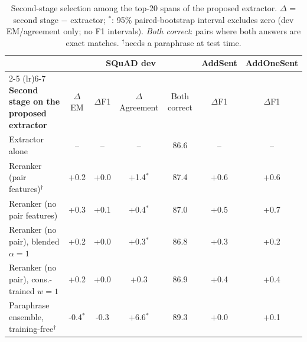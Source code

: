 \begin{table}[t]
\centering\small
\setlength{\tabcolsep}{5pt}
\begin{tabular}{lcccc@{\hspace{14pt}}cc}
\toprule
& \multicolumn{4}{c}{\textbf{SQuAD dev}} & \textbf{AddSent} & \textbf{AddOneSent} \\
\cmidrule(lr){2-5} \cmidrule(lr){6-7}
\textbf{Second stage on the proposed extractor} & $\Delta$EM & $\Delta$F1 & $\Delta$Agreement & Both correct & $\Delta$F1 & $\Delta$F1 \\
\midrule
Extractor alone & -- & -- & -- & 86.6 & -- & -- \\
Reranker (pair features)$^\dagger$ & +0.2 & +0.0 & +1.4$^{*}$ & 87.4 & +0.6 & +0.6 \\
Reranker (no pair features) & +0.3 & +0.1 & +0.4$^{*}$ & 87.0 & +0.5 & +0.7 \\
Reranker (no pair), blended $\alpha{=}1$ & +0.2 & +0.0 & +0.3$^{*}$ & 86.8 & +0.3 & +0.2 \\
Reranker (no pair), cons.-trained $w{=}1$ & +0.2 & +0.0 & +0.3 & 86.9 & +0.4 & +0.4 \\
Paraphrase ensemble, training-free$^\dagger$ & -0.4$^{*}$ & -0.3 & +6.6$^{*}$ & 89.3 & +0.0 & +0.1 \\
\bottomrule
\end{tabular}
\caption{Second-stage selection among the top-20 spans of the proposed extractor. $\Delta$ = second stage $-$ extractor; $^{*}$: 95\% paired-bootstrap interval excludes zero (dev EM/agreement only; no F1 intervals). \emph{Both correct}: pairs where both answers are exact matches. $^\dagger$needs a paraphrase at test time.}
\label{tab:second}
\end{table}
